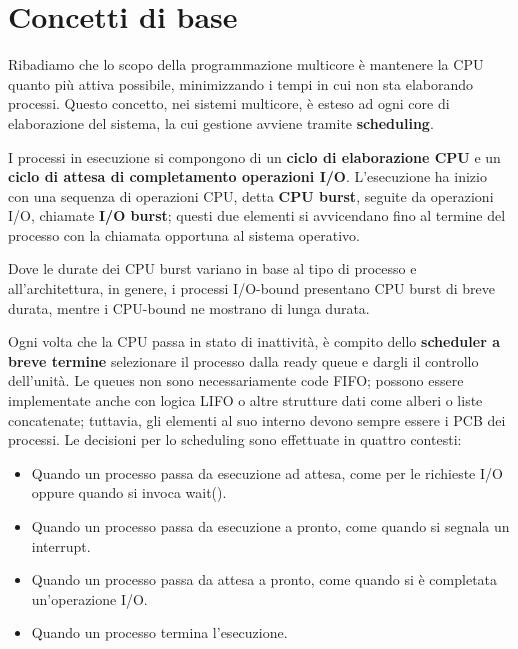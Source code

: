 \section{Concetti di base}
Ribadiamo che lo scopo della programmazione multicore è mantenere la CPU quanto più attiva possibile, minimizzando i tempi in cui non sta elaborando
processi. Questo concetto, nei sistemi multicore, è esteso ad ogni core di elaborazione del sistema, la cui gestione avviene tramite
\textbf{scheduling}.\par
I processi in esecuzione si compongono di un \textbf{ciclo di elaborazione CPU} e un \textbf{ciclo di attesa di completamento operazioni I/O}.
L'esecuzione ha inizio con una sequenza di operazioni CPU, detta \textbf{CPU burst}, seguite da operazioni I/O, chiamate \textbf{I/O burst}; questi due
elementi si avvicendano fino al termine del processo con la chiamata opportuna al sistema operativo.\par
Dove le durate dei CPU burst variano in base al tipo di processo e all'architettura, in genere, i processi I/O-bound presentano CPU burst di breve
durata, mentre i CPU-bound ne mostrano di lunga durata.\par
Ogni volta che la CPU passa in stato di inattività, è compito dello \textbf{scheduler a breve termine} selezionare il processo dalla ready queue e dargli
il controllo dell'unità. Le queues non sono necessariamente code FIFO; possono essere implementate anche con logica LIFO o altre strutture dati come
alberi o liste concatenate; tuttavia, gli elementi al suo interno devono sempre essere i PCB dei processi. Le decisioni per lo scheduling sono
effettuate in quattro contesti: \begin{itemize}
    \item Quando un processo passa da esecuzione ad attesa, come per le richieste I/O oppure quando si invoca wait().
    \item Quando un processo passa da esecuzione a pronto, come quando si segnala un interrupt.
    \item Quando un processo passa da attesa a pronto, come quando si è completata un'operazione I/O.
    \item Quando un processo termina l'esecuzione.
\end{itemize}

